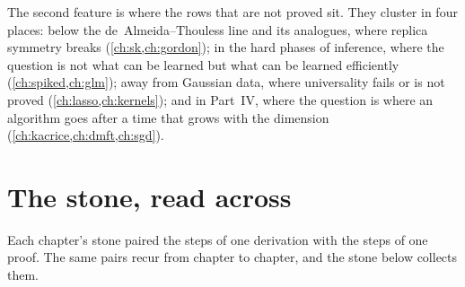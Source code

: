 \begin{refsection}
The second feature is where the rows that are not proved sit. They cluster in four places: below the de~Almeida--Thouless line and its analogues, where replica symmetry breaks (\cref{ch:sk,ch:gordon}); in the hard phases of inference, where the question is not what can be learned but what can be learned efficiently (\cref{ch:spiked,ch:glm}); away from Gaussian data, where universality fails or is not proved (\cref{ch:lasso,ch:kernels}); and in Part~IV, where the question is where an algorithm goes after a time that grows with the dimension (\cref{ch:kacrice,ch:dmft,ch:sgd}).

\section*{The stone, read across}

Each chapter's stone paired the steps of one derivation with the steps of one proof. The same pairs recur from chapter to chapter, and the stone below collects them.


\end{refsection}
